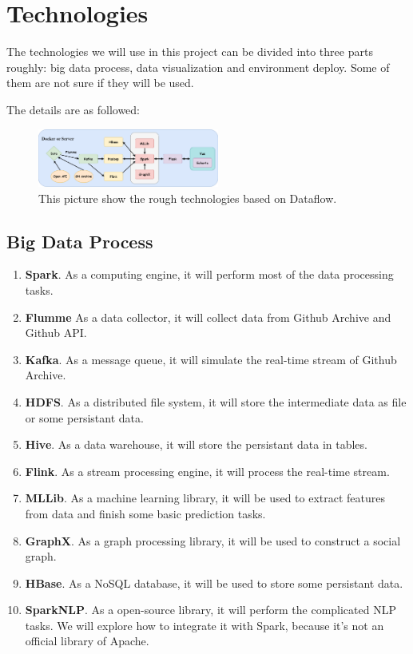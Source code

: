 \section{Technologies}

The technologies we will use in this project can be divided into three parts roughly: big data process, data visualization and environment deploy. Some of them are not sure if they will be used. 

The details are as followed:

    \begin{figure}[H]
        \centering
        \includegraphics[width=0.53\textwidth]{./pic/dataflow.png}
        \caption{This picture show the rough technologies based on Dataflow.}
        \label{fig:dataflow}
    \end{figure}


\subsection{Big Data Process}

\begin{enumerate}
    \item \textbf{Spark}. As a computing engine, it will perform most of the data processing tasks.
    \item \textbf{Flumme} As a data collector, it will collect data from Github Archive and Github API.
    \item \textbf{Kafka}. As a message queue, it will simulate the real-time stream of Github Archive.
    \item \textbf{HDFS}. As a distributed file system, it will store the intermediate data as file or some persistant data.
    \item \textbf{Hive}. As a data warehouse, it will store the persistant data in tables.
    \item \textbf{Flink}. As a stream processing engine, it will process the real-time stream.
    \item \textbf{MLLib}. As a machine learning library, it will be used to extract features from data and finish some basic prediction tasks.
    \item \textbf{GraphX}. As a graph processing library, it will be used to construct a social graph.
    \item \textbf{HBase}. As a NoSQL database, it will be used to store some persistant data.
    \item \textbf{SparkNLP}. As a open-source library, it will perform the complicated NLP tasks. We will explore how to integrate it with Spark, because it's not an official library of Apache.
\end{enumerate}


